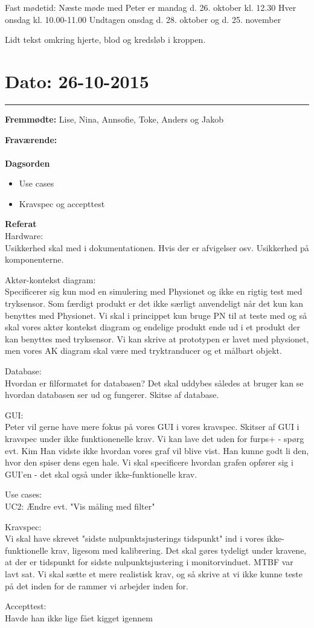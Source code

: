 Fast mødetid:
Næste møde med Peter er mandag d. 26. oktober kl. 12.30
Hver onsdag kl. 10.00-11.00
Undtagen onsdag d. 28. oktober og d. 25. november


Lidt tekst omkring hjerte, blod og kredsløb i kroppen.


\section{Dato: 26-10-2015}
\hrule

\textbf{Fremmødte:} Lise, Nina, Annsofie, Toke, Anders og Jakob

\textbf{Fraværende:} 
\\
\\
\textbf{Dagsorden}
\begin{itemize}
	\item Use cases
	\item Kravspec og accepttest
\end{itemize}

\textbf{Referat}
\\
Hardware:
\\
Usikkerhed skal med i dokumentationen. Hvis der er afvigelser osv. Usikkerhed på komponenterne.

Aktør-kontekst diagram:
\\
Specificerer sig kun mod en simulering med Physionet og ikke en rigtig test med tryksensor. 
Som færdigt produkt er det ikke særligt anvendeligt når det kun kan benyttes med Physionet. Vi skal i princippet kun bruge PN til at teste med og så skal vores aktør kontekst diagram og endelige produkt ende ud i et produkt der kan benyttes med tryksensor. 
Vi kan skrive at prototypen er lavet med physionet, men vores AK diagram skal være med tryktranducer og et målbart objekt.


Database:
\\
Hvordan er filformatet for databasen? Det skal uddybes således at bruger kan se hvordan databasen ser ud og fungerer.
Skitse af database.

GUI:
\\
Peter vil gerne have mere fokus på vores GUI i vores kravspec.
Skitser af GUI i kravspec under ikke funktionenelle krav.
Vi kan lave det uden for furps+ - spørg evt. Kim
Han vidste ikke hvordan vores graf vil blive vist. 
Han kunne godt li den, hvor den spiser dens egen hale.
Vi skal specificere hvordan grafen opfører sig i GUI'en - det skal også under ikke-funktionelle krav.


Use cases:
\\
UC2: Ændre evt. "Vis måling med filter"

Kravspec:
\\
Vi skal have skrevet "sidste nulpunktsjusterings tidspunkt" ind i vores ikke-funktionelle krav, ligesom med kalibrering. Det skal gøres tydeligt under kravene, at der er tidspunkt for sidste nulpunktsjustering i monitorvinduet.
MTBF var lavt sat. Vi skal sætte et mere realistisk krav, og så skrive at vi ikke kunne teste på det inden for de rammer vi arbejder inden for.

Accepttest:
\\
Havde han ikke lige fået kigget igennem